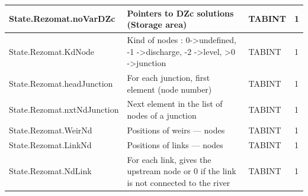\documentclass[a4paper,11pt]{article}
\begin{document}
\begin{landscape}
\begin{table}[ht]
\begin{center}
\begin{tabular}{|l|l|l|l|}
\hline  State.Rezomat.noVarDZc & Pointers to DZc solutions (Storage area) & TABINT & 1 \\
\hline  State.Rezomat.KdNode & Kind of nodes : 0->undefined, -1 ->discharge, -2 ->level, >0 ->junction & TABINT & 1 \\
\hline  State.Rezomat.headJunction & For each junction, first element (node number) & TABINT & 1 \\
\hline  State.Rezomat.nxtNdJunction & Next element in the list of nodes of a junction & TABINT & 1 \\
\hline  State.Rezomat.WeirNd & Positions of weirs --- nodes & TABINT & 1 \\
\hline  State.Rezomat.LinkNd & Positions of links --- nodes & TABINT & 1 \\
\hline  State.Rezomat.NdLink & For each link, gives the upstream node or 0 if the link is not connected to the river & TABINT & 1 \\
\hline

\end{tabular} 
\end{center}
\end{table}
\begin{table}[ht]
\begin{center}
\begin{tabular}{|l|l|l|l|}


\end{tabular}
\end{center}
\end{table}
\end{landscape}
\end{document}

